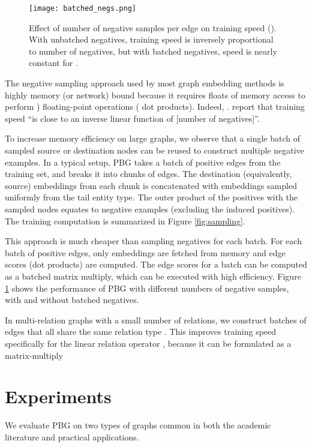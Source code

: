 \documentclass{article}
\begin{document}
\label{section:neg_sampling}

\begin{figure}[h]
\centering
\texttt{[image: batched\_negs.png]}
\caption{Effect of number of negative samples per edge on training speed (). With unbatched negatives, training speed is inversely proportional to number of negatives, but with batched negatives, speed is nearly constant for .}
\label{fig:batched_negs}
\end{figure}

The negative sampling approach used by most graph embedding methods is highly memory (or network) bound because it requires  floats of memory access to perform ) floating-point operations ( dot products). Indeed, \citeauthor{wu2017starspace}. report that training speed ``is close to an inverse linear function of [number of negatives]''.

To increase memory efficiency on large graphs, we observe that a single batch of  sampled source or destination nodes can be reused to construct multiple negative examples. In a typical setup, PBG takes a batch of  positive edges from the training set, and breaks it into chunks of  edges. The destination (equivalently, source) embeddings from each chunk is concatenated with  embeddings sampled uniformly from the tail entity type. The outer product of the  positives with the  sampled nodes equates to  negative examples (excluding the induced positives). The training computation is summarized in Figure \ref{fig:sampling}.

This approach is much cheaper than sampling negatives for each batch. For each batch of  positive edges, only  embeddings are fetched from memory and  edge scores (dot products) are computed. The edge scores for a batch can be computed as a batched  matrix multiply, which can be executed with high efficiency. Figure \ref{fig:batched_negs} shows the performance of PBG with different numbers of negative samples, with and without batched negatives.

In multi-relation graphs with a small number of relations, we construct batches of edges that all share the same relation type . This improves training speed specifically for the linear relation operator , because it can be formulated as a matrix-multiply  



\section{Experiments}
We evaluate PBG on two types of graphs common in both the academic literature and practical applications. 
\end{document}
